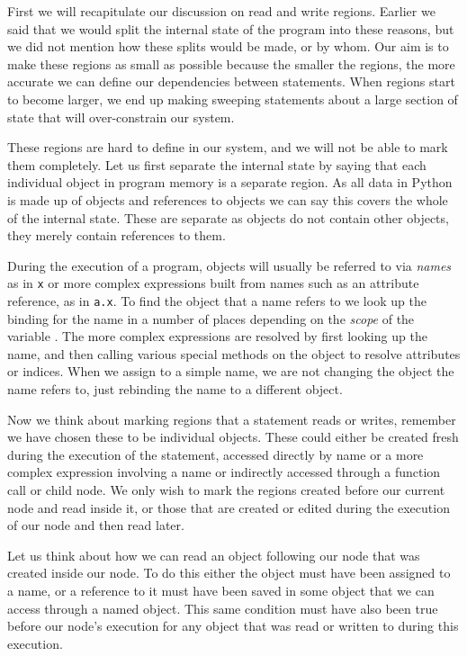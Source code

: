 \documentclass{report}
\begin{document}
First we will recapitulate our discussion on read and write regions. Earlier we said that we would split the internal state of the program into these reasons,
but we did not mention how these splits would be made, or by whom. Our aim is to make these regions as small as possible because the smaller the regions, the
more accurate we can define our dependencies between statements. When regions start to become larger, we end up making sweeping statements about a large section
of state that will over-constrain our system.

These regions are hard to define in our system, and we will not be able to mark them completely. Let us first separate the internal state by saying that each
individual object in program memory is a separate region. As all data in Python is made up of objects and references to objects \cite{datamodel} we can say
this covers the whole of the internal state. These are separate as objects do not contain other objects, they merely contain references to them.

During the execution of a program, objects will usually be referred to via \textit{names} as in \texttt{x} or more complex expressions built from names such
as an attribute reference, as in \texttt{a.x}. To find the object that a name refers to we look up the binding for the name in a number of places depending
on the \textit{scope} of the variable \cite{namebinding}. The more complex expressions are resolved by first looking up the name, and then calling various
special methods on the object to resolve attributes or indices. When we assign to a simple name, we are not changing the object the name refers to, just
rebinding the name to a different object.

Now we think about marking regions that a statement reads or writes, remember we have chosen these to be individual objects. These could either be created
fresh during the execution of the statement, accessed directly by name or a more complex expression involving a name or indirectly accessed through a
function call or child node. We only wish to mark the regions created before our current node and read inside it, or those that are created or edited
during the execution of our node and then read later.

Let us think about how we can read an object following our node that was created inside our node. To do this either the object must have been assigned to a
name, or a reference to it must have been saved in some object that we can access through a named object. This same condition must have also been true before
our node's execution for any object that was read or written to during this execution.
\end{document}
